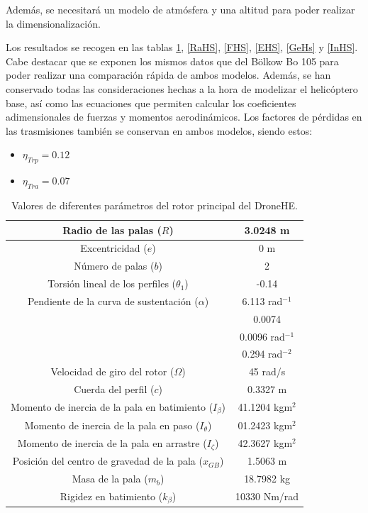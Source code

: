 Además, se necesitará un modelo de atmósfera y una altitud para poder realizar la dimensionalización.

Los resultados se recogen en las tablas \ref{RPHS}, \ref{RaHS}, \ref{FHS}, \ref{EHS}, \ref{GeHs} y \ref{InHS}. Cabe destacar que se exponen los mismos datos que del Bölkow Bo 105 para poder realizar una comparación rápida de ambos modelos. Además, se han conservado todas las consideraciones hechas a la hora de modelizar el helicóptero base, así como las ecuaciones que permiten calcular los coeficientes adimensionales de fuerzas y momentos aerodinámicos. Los factores de pérdidas en las trasmisiones también se conservan en ambos modelos, siendo estos:
\begin{itemize}
	\item $\eta_{Trp}=0.12$
	\item $\eta_{Tra}=0.07$
\end{itemize}
\begin{table}[]
	\centering
	\begin{tabular}{|>{\columncolor{Gray}}c|c|}
		\hline
		Radio de las palas ($R$) & 3.0248 m \\ \hline
		Excentricidad ($e$) & 0 m \\ \hline
		Número de palas ($b$) & 2 \\ \hline
		Torsión lineal de los perfiles ($\theta_1$) & -0.14 \\ \hline
		Pendiente de la curva de sustentación ($\alpha$) & 6.113 rad$^{-1}$ \\ \hline
		\cellcolor{Gray} & 0.0074 \\ \cline{2-2} 
		\cellcolor{Gray} & 0.0096 rad$^{-1}$ \\ \cline{2-2} 
		\multirow{-3}{*}{\cellcolor{Gray}Parámetros de la polar ($\delta_0$, $\delta_1$, $\delta_2$)} & 0.294 rad$^{-2}$ \\ \hline
		Velocidad de giro del rotor ($\Omega$) & 45 rad/s \\ \hline
		Cuerda del perfil ($c$) & 0.3327 m \\ \hline
		Momento de inercia de la pala en batimiento ($I_\beta$) & 41.1204 kgm$^2$ \\ \hline
		Momento de inercia de la pala en paso ($I_\theta$) & 01.2423 kgm$^2$ \\ \hline
		Momento de inercia de la pala en arrastre ($I_\zeta$) & 42.3627 kgm$^2$ \\ \hline
		Posición del centro de gravedad de la pala ($x_{GB}$) & 1.5063 m \\ \hline
		Masa de la pala ($m_b$) & 18.7982 kg \\ \hline
		Rigidez en batimiento ($k_\beta$) & 10330 Nm/rad \\ \hline
	\end{tabular}
	\caption{Valores de diferentes parámetros del rotor principal del DroneHE.}
	\label{RPHS}
\end{table}

